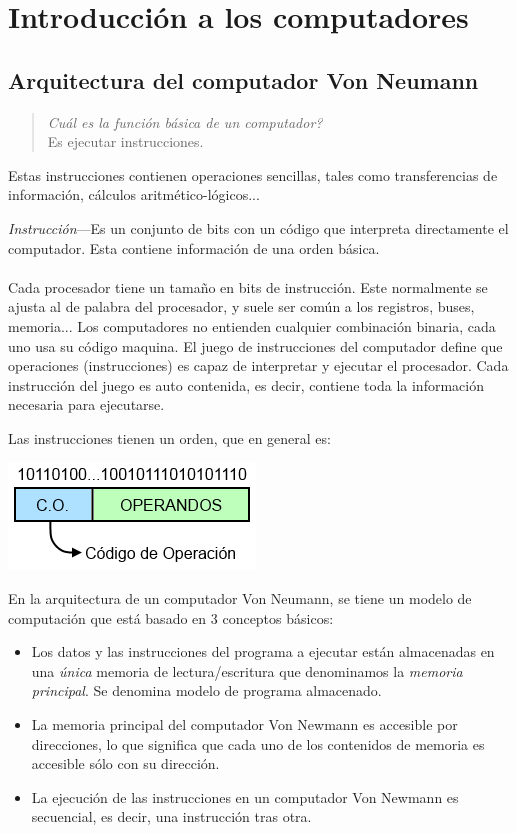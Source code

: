\documentclass[a4paper,11pt,spanish]{report}
\begin{document}
\chapter{Introducción a los computadores}
\section{Arquitectura del computador Von Neumann}

\begin{quote}
\begin{center}
\emph{\textquestiondown Cuál es la función básica de un computador?} \\ Es ejecutar instrucciones.
\end{center}
\end{quote}
Estas instrucciones contienen operaciones sencillas, tales como transferencias de información, cálculos aritmético-lógicos...

\emph{Instrucción}---Es un conjunto de bits con un código que interpreta directamente el computador. Esta contiene información de una orden básica.
\\\\
Cada procesador tiene un tamaño en bits de instrucción. Este normalmente se ajusta al de palabra del procesador, y suele ser común a los registros, buses, memoria...
Los computadores no entienden cualquier combinación binaria, cada uno usa su código maquina.
El juego de instrucciones del computador define que operaciones (instrucciones) es capaz de interpretar y ejecutar el procesador.
Cada instrucción del juego es auto contenida, es decir, contiene toda la información necesaria para ejecutarse.

Las instrucciones tienen un orden, que en general es:

\begin{center}
\includegraphics{res/tema1/instrucciones.png}
\end{center}

En la arquitectura de un computador Von Neumann, se tiene un modelo de computación que está basado en 3 conceptos básicos:
\begin{itemize}
\item Los datos y las instrucciones del programa a ejecutar están almacenadas en una \emph{única} memoria de lectura/escritura que denominamos la \emph{memoria principal}. Se denomina modelo de programa almacenado.
\item La memoria principal del computador Von Newmann es accesible por direcciones, lo que significa que cada uno de los contenidos de memoria es accesible sólo con su dirección.
\item La ejecución de las instrucciones en un computador Von Newmann es secuencial, es decir, una instrucción tras otra.
\end{itemize}
\end{document}
